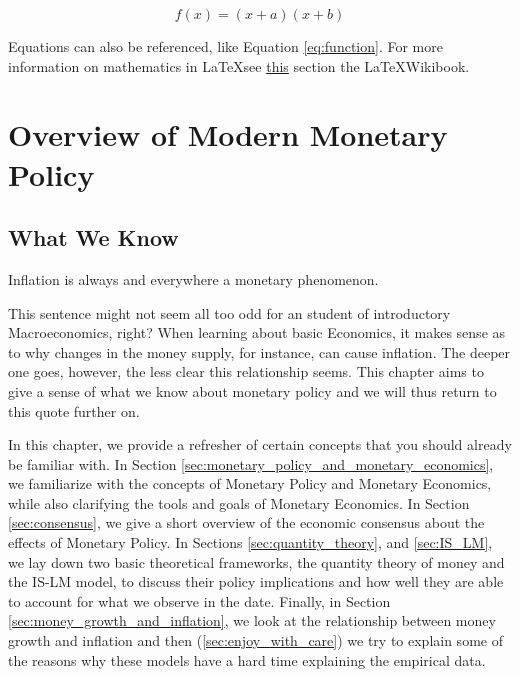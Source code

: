 \documentclass[11pt,a4paper,oneside]{book}
\newcommand{\latex}{\LaTeX{}} %
\begin{document}
\begin{equation}
  f(x)=(x+a)(x+b)
  \label{eq:function}
\end{equation}

Equations can also be referenced, like Equation \ref{eq:function}. For more information on mathematics in \latex see \href{https://en.wikibooks.org/wiki/LaTeX/Mathematics}{this} section the \latex Wikibook.

\part{Overview of Modern Monetary Policy}
\chapter{What We Know}
\epigraph{Inflation is always and everywhere a monetary phenomenon.}{\citet{Friedman_1963}}

This sentence might not seem all too odd for an student of introductory Macroeconomics, right? When learning about basic Economics, it makes sense as to why changes in the money supply, for instance, can cause inflation. The deeper one goes, however, the less clear this relationship seems. This chapter aims to give a sense of what we know about monetary policy and we will thus return to this quote further on.

In this chapter, we provide a refresher of certain concepts that you should already be familiar with. In Section \ref{sec:monetary_policy_and_monetary_economics}, we familiarize with the concepts of Monetary Policy and Monetary Economics, while also clarifying the tools and goals of Monetary Economics. In Section \ref{sec:consensus}, we give a short overview of the economic consensus about the effects of Monetary Policy. In Sections \ref{sec:quantity_theory}, and \ref{sec:IS_LM}, we lay down two basic theoretical frameworks, the quantity theory of money and the IS-LM model, to discuss their policy implications and how well they are able to account for what we observe in the date. Finally, in Section \ref{sec:money_growth_and_inflation}, we look at the relationship between money growth and inflation and then (\ref{sec:enjoy_with_care}) we try to explain some of the reasons why these models have a hard time explaining the empirical data.
\end{document}

